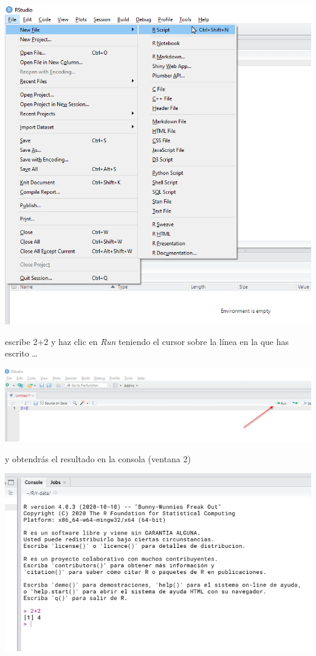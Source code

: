\documentclass[
]{book}
\begin{document}
\includegraphics{data/RS04.png}

escribe 2+2 y haz clic en \emph{Run} teniendo el cursor sobre la línea en la que has escrito \ldots{}

\includegraphics{data/RS05.png}

y obtendrás el resultado en la consola (ventana 2)

\includegraphics{data/RS06.png}
\end{document}
